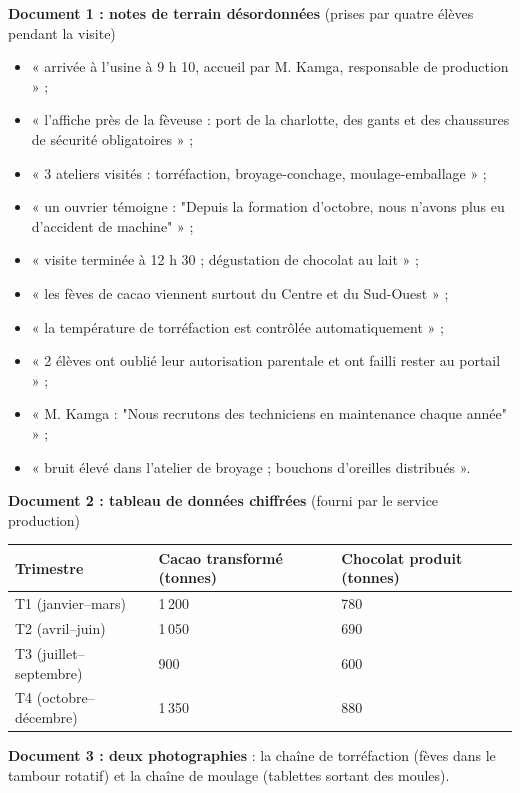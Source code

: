 \documentclass[11pt]{article}
\begin{document}
\textbf{Document 1 : notes de terrain désordonnées} (prises par quatre élèves pendant la visite)
\begin{itemize}
\item « arrivée à l'usine à 9 h 10, accueil par M. Kamga, responsable de production » ;
\item « l'affiche près de la fèveuse : port de la charlotte, des gants et des chaussures de sécurité obligatoires » ;
\item « 3 ateliers visités : torréfaction, broyage-conchage, moulage-emballage » ;
\item « un ouvrier témoigne : "Depuis la formation d'octobre, nous n'avons plus eu d'accident de machine" » ;
\item « visite terminée à 12 h 30 ; dégustation de chocolat au lait » ;
\item « les fèves de cacao viennent surtout du Centre et du Sud-Ouest » ;
\item « la température de torréfaction est contrôlée automatiquement » ;
\item « 2 élèves ont oublié leur autorisation parentale et ont failli rester au portail » ;
\item « M. Kamga : "Nous recrutons des techniciens en maintenance chaque année" » ;
\item « bruit élevé dans l'atelier de broyage ; bouchons d'oreilles distribués ».
\end{itemize}

\textbf{Document 2 : tableau de données chiffrées} (fourni par le service production)

\begin{center}
\begin{tabularx}{\linewidth}{|l|X|X|}\hline
\rowcolor{popblueL} \textbf{Trimestre} & \textbf{Cacao transformé (tonnes)} & \textbf{Chocolat produit (tonnes)} \\ \hline
T1 (janvier--mars) & 1\,200 & 780 \\ \hline
T2 (avril--juin) & 1\,050 & 690 \\ \hline
T3 (juillet--septembre) & 900 & 600 \\ \hline
T4 (octobre--décembre) & 1\,350 & 880 \\ \hline
\end{tabularx}
\end{center}

\textbf{Document 3 : deux photographies} : la chaîne de torréfaction (fèves dans le tambour rotatif) et la chaîne de moulage (tablettes sortant des moules).
\end{document}
